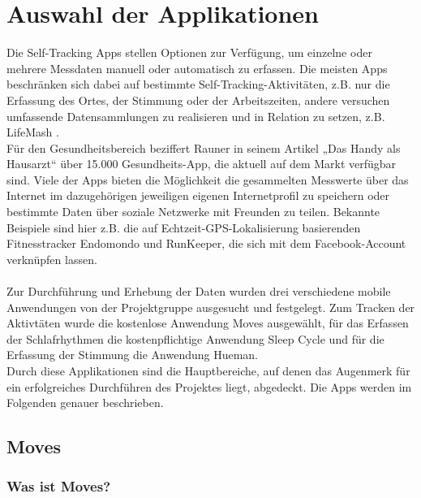 
\chapter{Auswahl der Applikationen}
\label{ch:Apps}

Die Self-Tracking Apps stellen Optionen zur Verfügung, um einzelne oder mehrere Messdaten manuell oder automatisch zu erfassen. 
Die meisten Apps beschränken sich dabei auf bestimmte Self-Tracking-Aktivitäten, z.B. nur die Erfassung des Ortes, der Stimmung oder der Arbeitszeiten, andere versuchen umfassende Datensammlungen zu realisieren und in Relation zu setzen, z.B. LifeMash \cite{web:SleepCycle}. \\
Für den Gesundheitsbereich beziffert Rauner in seinem Artikel „Das Handy als Hausarzt“ über 15.000 Gesundheits-App, die aktuell auf dem Markt verfügbar sind. 
Viele der Apps bieten die Möglichkeit die gesammelten Messwerte über das Internet im dazugehörigen jeweiligen eigenen Internetprofil zu speichern oder bestimmte Daten über soziale Netzwerke mit Freunden zu teilen. 
Bekannte Beispiele sind hier z.B. die auf Echtzeit-GPS-Lokalisierung basierenden Fitnesstracker Endomondo und RunKeeper, die sich mit dem Facebook-Account verknüpfen lassen. 
\\
\\
Zur Durchführung und Erhebung der Daten wurden drei verschiedene mobile Anwendungen von der Projektgruppe ausgesucht und festgelegt.
Zum Tracken der Aktivtäten wurde die kostenlose Anwendung Moves ausgewählt, für das Erfassen der Schlafrhythmen die kostenpflichtige Anwendung Sleep Cycle und für die Erfassung der Stimmung die Anwendung Hueman.\\
Durch diese Applikationen sind die Hauptbereiche, auf denen das Augenmerk für ein erfolgreiches Durchführen des Projektes liegt, abgedeckt.
Die Apps werden im Folgenden genauer beschrieben.


\section{Moves}
\label{ch:Apps:sec:Moves}

\subsection{Was ist Moves?}
\label{ch:Apps:sec:Moves:subsec:WIM}

